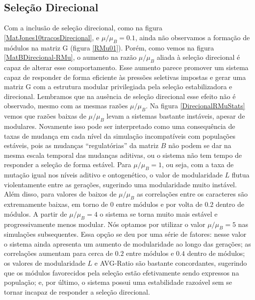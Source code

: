 \subsection{Seleção Direcional}
\label{cap3:DirecB}

Com a inclusão de seleção direcional, como na figura
\ref{MatJones10tracosDirecional}, e $\mu/\mu_B = 0.1$, ainda não
observamos a formação de módulos na matriz G (figura \ref{RMu01}). 
Porém, como vemos na figura \ref{MatBDirecional-RMu}, o aumento  na
razão $\mu/\mu_B$ aliada à seleção direcional é capaz de alterar esse
comportamento. 
Esse aumento parece promover um sistema capaz de responder de forma
eficiente às pressões seletivas impostas e gerar uma matriz G com a
estrutura modular privilegiada pela seleção estabilizadora e direcional. 
Lembramos que na ausência de seleção direcional esse efeito não é
observado, mesmo com as mesmas razões $\mu/\mu_B$. 
Na figura \ref{DirecionalRMuStats} vemos que razões baixas de $\mu/\mu_B$ levam
a sistemas bastante instáveis, apesar de modulares. 
Novamente isso pode ser interpretado como uma consequência de taxas de
mudança em cada nível da simulação incompatíveis com populações
estáveis, pois as mudanças ``regulatórias'' da matriz $B$ não podem se dar na mesma
escala temporal das mudanças aditivas, ou o sistema não tem tempo de
responder a seleção de forma estável. 
Para $\mu/\mu_B=1$, ou seja, com a taxa de mutação igual nos níveis
aditivo e ontogenético, o valor de modularidade $L$ flutua violentamente entre
as gerações, sugerindo uma modularidade muito instável. 
Além disso, para valores de baixos de $\mu/\mu_B$ as correlações entre
os caracteres são extremamente baixas, em torno de $0$ entre módulos e
por volta de $0.2$ dentro de módulos.
A partir de $\mu/\mu_B=4$ o sistema se torna muito mais estável e
progressivamente menos modular. 
Nós optamos por utilizar o valor $\mu/\mu_B=5$ nas simulações
subsequentes. 
Essa opção se deu por uma série de fatores: nesse valor o sistema ainda
apresenta um aumento de modularidade ao longo das gerações; as
correlações aumentam para cerca de $0.2$ entre módulos e $0.4$ dentro de
módulos; os valores de modularidade $L$ e AVG-Ratio são bastante
concordantes, sugerindo que os módulos favorecidos pela seleção estão
efetivamente sendo expressos na população; e, por último, o sistema
possui uma estabilidade razoável sem se tornar incapaz de responder a
seleção direcional. 


